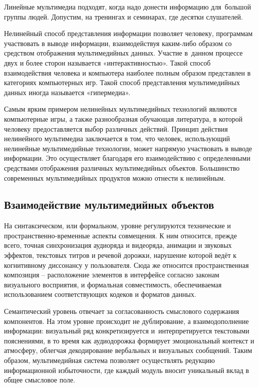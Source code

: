 \documentclass{ou}
\begin{document}
Линейные мультимедиа подходят, когда надо донести информацию для~большой группы людей. Допустим, на тренингах и семинарах, где десятки слушателей.

Нелинейный способ представления информации позволяет человеку, программам участвовать в выводе информации, взаимодействуя каким-либо образом со средством отображения мультимедийных данных. Участие в~данном процессе двух и более сторон называется «интерактивностью». Такой способ взаимодействия человека и компьютера наиболее полным образом представлен в категориях компьютерных игр. Такой способ представления мультимедийных данных иногда называется «гипермедиа».

Самым ярким примером нелинейных мультимедийных технологий являются компьютерные игры, а также разнообразная обучающая литература, в которой человеку предоставляется выбор различных действий. Принцип действия нелинейного мультимедиа заключается в том, что человек, использующий нелинейные мультимедийные технологии, может напрямую участвовать в выводе информации. Это осуществляет благодаря его взаимодействию с определенными средствами отображения различных мультимедийных объектов. Большинство современных мультимедийных продуктов можно отнести к нелинейным\cite{digitalocean}. 
\subsection{Взаимодействие мультимедийных объектов}
На синтаксическом, или формальном, уровне регулируются технические и пространственно-временные аспекты совмещения. К ним относится, прежде всего, точная синхронизация аудиоряда и видеоряда, анимации и звуковых эффектов, текстовых титров и речевой дорожки, нарушение которой ведёт к когнитивному диссонансу у пользователя. Сюда же относится пространственная композиция -- расположение элементов в интерфейсе согласно законам визуального восприятия, и формальная совместимость, обеспечиваемая использованием соответствующих кодеков и форматов данных.

Семантический уровень отвечает за согласованность смыслового содержания компонентов. На этом уровне происходит не дублирование, а взаимодополнение информации: визуальный ряд конкретизируется и~интерпретируется текстовыми пояснениями, в то время как аудиодорожка формирует эмоциональный контекст и атмосферу, облегчая декодирование вербальных и визуальных сообщений. Таким образом, мультимедийная система позволяет осуществлять редукцию информационной избыточности, где каждый модуль вносит уникальный вклад в общее смысловое поле.
\end{document}
